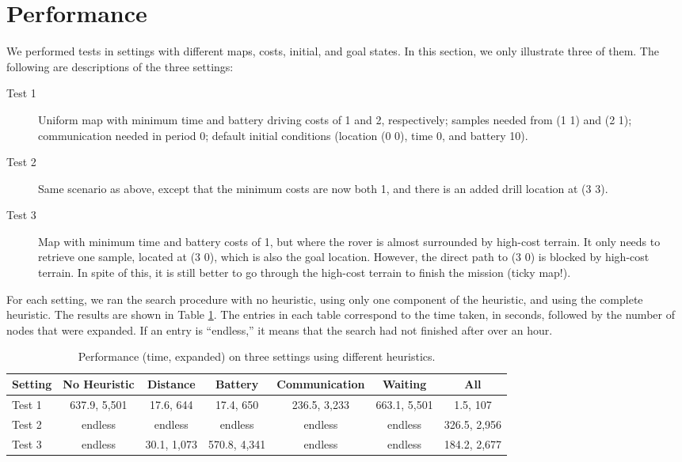 \section{Performance}

We performed tests in settings with different maps, costs, initial, and goal states. In this section, we only
illustrate three of them. The following are descriptions of the three settings:

\begin{description}
	\item[Test 1] Uniform map with minimum time and battery driving costs of 1 and 2, respectively; samples
		needed from (1 1) and (2 1); communication needed in period 0; default initial conditions (location
		(0 0), time 0, and battery 10).
	\item[Test 2] Same scenario as above, except that the minimum costs are now both 1, and there is an
		added drill location at (3 3).
	\item[Test 3] Map with minimum time and battery costs of 1, but where the rover is almost surrounded
		by high-cost terrain. It only needs to retrieve one sample, located at (3 0), which is also the goal
		location. However, the direct path to (3 0) is blocked by high-cost terrain. In spite of this, it
		is still better to go through the high-cost terrain to finish the mission (ticky map!).
\end{description}

For each setting, we ran the search procedure with no heuristic, using only one component of the heuristic, and
using the complete heuristic. The results are shown in Table \ref{times}. The entries in each table correspond
to the time taken, in seconds, followed by the number of nodes that were expanded. If an entry is ``endless,''
it means that the search had not finished after over an hour.

\begin{table}
 	\caption{Performance (time, expanded) on three settings using different heuristics.}
   \centering
 	\begin{tabular}{|l|c|c|c|c|c|c|}
 		\hline
 		\textbf{Setting} & \textbf{No Heuristic} & \textbf{Distance} & \textbf{Battery} & \textbf{Communication} & \textbf{Waiting} & \textbf{All}\\ \hline
 		Test 1           & 637.9, 5,501  & 17.6, 644   & 17.4, 650    & 236.5, 3,233 & 663.1, 5,501 & 1.5, 107      \\ \hline
 		Test 2           & endless       & endless     & endless      & endless      & endless      & 326.5, 2,956  \\ \hline
 		Test 3           & endless       & 30.1, 1,073 & 570.8, 4,341 & endless      & endless      & 184.2, 2,677  \\ \hline
 	\end{tabular}
 	\label{times}
\end{table}

